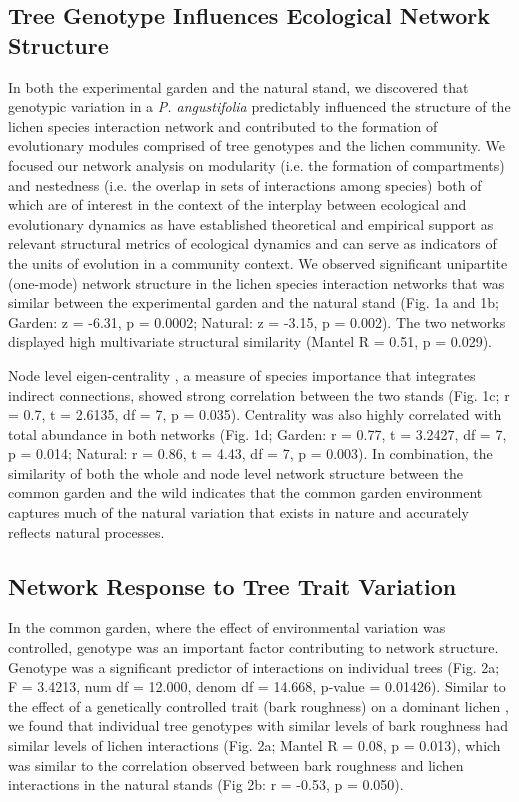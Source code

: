 \documentclass[fleqn,10pt]{wlscirep}
\begin{document}

\subsection*{Tree Genotype Influences Ecological Network Structure}

In both the experimental garden and the natural stand, we discovered
that genotypic variation in a \textit{P. angustifolia} predictably
influenced the structure of the lichen species interaction network and
contributed to the formation of evolutionary modules comprised of tree
genotypes and the lichen community.  We focused our network analysis
on modularity (i.e. the formation of compartments) and nestedness
(i.e. the overlap in sets of interactions among species) both of which
are of interest in the context of the interplay between ecological and
evolutionary dynamics as have established theoretical and empirical
support as relevant structural metrics of ecological dynamics and can
serve as indicators of the units of evolution in a community context.
We observed significant unipartite (one-mode) network structure
\cite{Araujo2011} in the lichen species interaction networks that was
similar between the experimental garden and the natural stand (Fig. 1a
and 1b; Garden: z = -6.31, p = 0.0002; Natural: z = -3.15, p =
0.002). The two networks displayed high multivariate structural
similarity (Mantel R = 0.51, p = 0.029).

Node level eigen-centrality \cite{DeAngelis1989}, a measure of species
importance that integrates indirect connections, showed strong
correlation between the two stands (Fig. 1c; r = 0.7, t = 2.6135, df =
7, p = 0.035). Centrality was also highly correlated with total
abundance in both networks (Fig. 1d; Garden: r = 0.77, t = 3.2427, df
= 7, p = 0.014; Natural:  r = 0.86, t = 4.43, df = 7, p = 0.003). In
combination, the similarity of both the whole and node level network
structure between the common garden and the wild indicates that the
common garden environment captures much of the natural variation that
exists in nature and accurately reflects natural processes.

\subsection*{Network Response to Tree Trait Variation}

In the common garden, where the effect of environmental variation was
controlled, genotype was an important factor contributing to network
structure. Genotype was a significant predictor of interactions on
individual trees (Fig. 2a; F = 3.4213, num df = 12.000, denom df =
14.668, p-value = 0.01426). Similar to the effect of a genetically
controlled trait (bark roughness) on a dominant lichen
\cite{Ellison2005}, we found that individual tree genotypes with
similar levels of bark roughness had similar levels of lichen
interactions (Fig. 2a; Mantel R = 0.08, p = 0.013), which was similar
to the correlation observed between bark roughness and lichen
interactions in the natural stands (Fig 2b: r = -0.53, p = 0.050).
\end{document}
